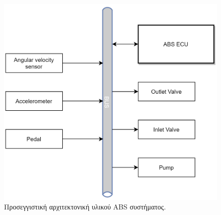 \documentclass{article}
\begin{document}
\begin{figure}[H]
    \begin{center}
    \includegraphics[scale=0.15]{images/hardware-architecture-preview.png}
    \end{center}
    \caption{Προσεγγιστική αρχιτεκτονική υλικού ABS συστήματος.}
    \label{fig:hardware-architecture-preview}
\end{figure}
\end{document}
